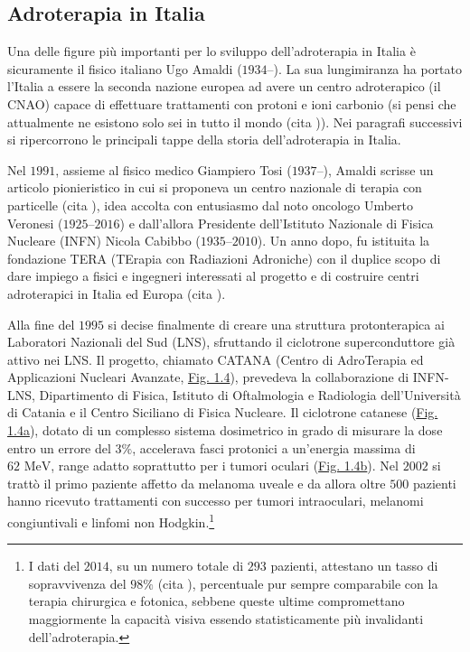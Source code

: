 \documentclass[12pt,a4paper,twoside]{report}
\begin{document}
	\subsection{Adroterapia in Italia}
	Una delle figure più importanti per lo sviluppo dell'adroterapia in Italia è sicuramente il fisico italiano Ugo Amaldi ($1934$--). La sua lungimiranza ha portato l'Italia a essere la seconda nazione europea ad avere un centro adroterapico (il CNAO) capace di effettuare trattamenti con protoni e ioni carbonio (si pensi che attualmente ne esistono solo sei in tutto il mondo (cita
	)). Nei paragrafi successivi si ripercorrono le principali tappe della storia dell'adroterapia in Italia.
	
	Nel $1991$, assieme al fisico medico Giampiero Tosi ($1937$--), Amaldi scrisse un articolo pionieristico in cui si proponeva un centro nazionale di terapia con particelle (cita
	), idea accolta con entusiasmo dal noto oncologo Umberto Veronesi ($1925$--$2016$) e dall'allora Presidente dell'Istituto Nazionale di Fisica Nucleare (INFN) Nicola Cabibbo ($1935$--$2010$). Un anno dopo, fu istituita la fondazione TERA (TErapia con Radiazioni Adroniche) con il duplice scopo di dare impiego a fisici e ingegneri interessati al progetto e di costruire centri adroterapici in Italia ed Europa (cita
	).
	
	Alla fine del $1995$ si decise finalmente di creare una struttura protonterapica ai Laboratori Nazionali del Sud (LNS), sfruttando il ciclotrone superconduttore già attivo nei LNS. Il progetto, chiamato CATANA (Centro di AdroTerapia ed Applicazioni Nucleari Avanzate, \hyperref[fig:catana]{Fig. 1.4}), prevedeva la collaborazione di INFN-LNS, Dipartimento di Fisica, Istituto di Oftalmologia e Radiologia dell'Università di Catania e il Centro Siciliano di Fisica Nucleare. Il ciclotrone catanese (\hyperref[fig:catana1]{Fig. 1.4a}), dotato di un complesso sistema dosimetrico in grado di misurare la dose entro un errore del $3\%$, accelerava fasci protonici a un'energia massima di $62 \mbox{ MeV}$, range adatto soprattutto per i tumori oculari (\hyperref[fig:catana2]{Fig. 1.4b}). Nel $2002$ si trattò il primo paziente affetto da melanoma uveale e da allora oltre $500$ pazienti hanno ricevuto trattamenti con successo per tumori intraoculari, melanomi congiuntivali e linfomi non Hodgkin.\footnote{I dati del $2014$, su un numero totale di $293$ pazienti, attestano un tasso di sopravvivenza del $98\%$ (cita
	), percentuale pur sempre comparabile con la terapia chirurgica e fotonica, sebbene queste ultime compromettano maggiormente la capacità visiva essendo statisticamente più invalidanti dell'adroterapia.}
	
\end{document}
